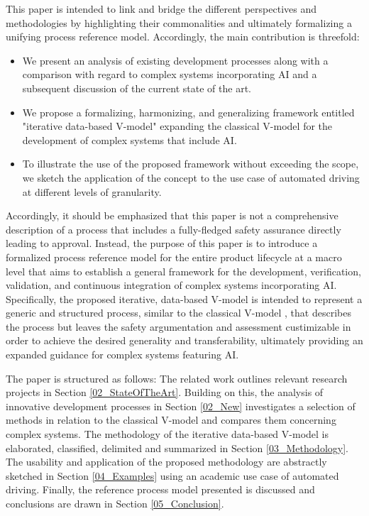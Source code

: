 This paper is intended to link and bridge the different perspectives and methodologies by highlighting their commonalities and ultimately formalizing a unifying process reference model. Accordingly, the main contribution is threefold:

\begin{itemize}
	\item We present an analysis of existing development processes along with a comparison with regard to complex systems incorporating AI and a subsequent discussion of the current state of the art.
	\item We propose a formalizing, harmonizing, and generalizing framework entitled "iterative data-based V-model" expanding the classical V-model \cite{brohl1993v} for the development of complex systems that include AI.
	\item To illustrate the use of the proposed framework without exceeding the scope, we sketch the application of the concept to the use case of automated driving at different levels of granularity.
\end{itemize}

Accordingly, it should be emphasized that this paper is not a comprehensive description of a process that includes a fully-fledged safety assurance directly leading to approval. Instead, the purpose of this paper is to introduce a formalized process reference model for the entire product lifecycle at a macro level that aims to establish a general framework for the development, verification, validation, and continuous integration of complex systems incorporating AI. Specifically, the proposed iterative, data-based V-model is intended to represent a generic and structured process, similar to the classical V-model \cite{brohl1993v}, that describes the process but leaves the safety argumentation and assessment custimizable in order to achieve the desired generality and transferability, ultimately providing an expanded guidance for complex systems featuring AI.

The paper is structured as follows: The related work outlines relevant research projects in Section \ref{02_StateOfTheArt}. Building on this, the analysis of innovative development processes in Section \ref{02_New} investigates a selection of methods in relation to the classical V-model and compares them concerning complex systems. The methodology of the iterative data-based V-model is elaborated, classified, delimited and summarized in Section \ref{03_Methodology}. The usability and application of the proposed methodology are abstractly sketched in Section \ref{04_Examples} using an academic use case of automated driving. Finally, the reference process model presented is discussed and conclusions are drawn in Section \ref{05_Conclusion}.



